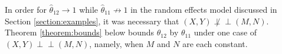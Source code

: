 \documentclass[12pt]{article}
\DeclareMathOperator{\AUC}{AUC}
\newcommand{\E}{E}
\renewcommand{\P}{P}
\newcommand{\cind}{\perp \!\!\! \perp}
\newcommand{\aucindiv}{\theta_{11}}%
\newcommand{\aucpop}{\theta_{12}}%
\newcommand{\aucindivhat}{\hat{\theta}_{11}}%
\newcommand{\aucpophat}{\hat{\theta}_{12}}%
\newcommand{\B}{B}
\newtheorem{lemma}[theorem]{Lemma}
\begin{document}



In order for $\aucpophat\to 1$ while $\aucindivhat\not\to 1$ in the
random effects model discussed in Section \ref{section:examples}, it
was necessary that $(X,Y)\not\cind (M,N)$. Theorem
\ref{theorem:bounds} below bounds $\aucpop$ by $\aucindiv$ under one case of $(X,Y)\cind (M,N)$, namely, when $M$ and $N$ are
each constant.


\end{document}
